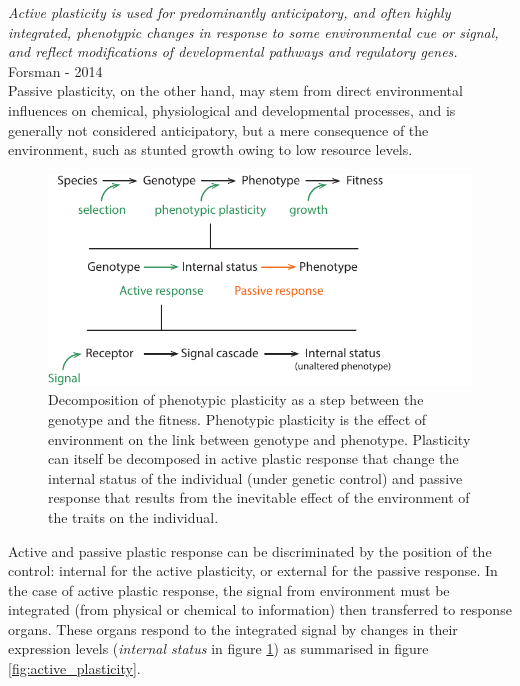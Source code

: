 \textit{Active plasticity is used for predominantly anticipatory, and often highly integrated, phenotypic changes in response to some environmental cue or signal, and reflect modifications of developmental pathways and regulatory genes.} Forsman - 2014\\


Passive plasticity, on the other hand, may stem from direct environmental influences on chemical, physiological and developmental processes, and is generally not considered anticipatory, but a mere consequence of the environment, such as stunted growth owing to low resource levels.\\


\begin{figure}
    \includegraphics[width=1\linewidth]{./2_PP/Figures/Concepts/genotype_to_phenotype.pdf}
  \caption[Decomposition of plastic response]{Decomposition of phenotypic plasticity as a step between the genotype and the fitness. Phenotypic plasticity is the effect of environment on the link between genotype and phenotype. Plasticity can itself be decomposed in active plastic response that change the internal status of the individual (under genetic control) and passive response that results from the inevitable effect of the environment of the traits on the individual.}
  \label{fig:plasticity_form}
\end{figure}

Active and passive plastic response can be discriminated by the position of the control: internal for the active plasticity, or external for the passive response. In the case of active plastic response, the signal from environment must be integrated (from physical or chemical to information) then transferred to response organs. These organs respond to the integrated signal by changes in their expression levels (\textit{internal status} in figure \ref{fig:plasticity_form}) as summarised in figure \ref{fig:active_plasticity}.

